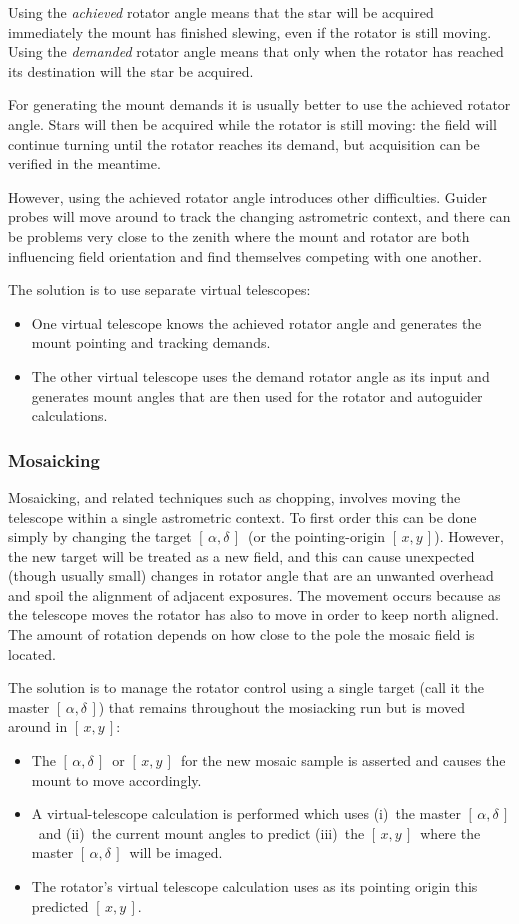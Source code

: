 \documentclass[12pt,fleqn,twoside]{article}
\renewcommand{\_}{{\tt\char'137}}     %
\newcommand{\radec}     {$[\,\alpha,\delta\,]$}
\newcommand{\xy}        {$[\,x,y\,]$}
\begin{document}
Using the {\it achieved}\/ rotator angle means that the star will be
acquired immediately the mount has finished slewing, even if the
rotator is still moving.  Using the {\it demanded}\/ rotator angle
means that only when the rotator has reached its destination will
the star be acquired.

For generating the mount demands it is usually better to use
the achieved rotator angle.  Stars will then be acquired while the
rotator is still moving:  the field will continue turning until the
rotator reaches its demand, but acquisition can be verified
in the meantime.

However, using the achieved rotator angle introduces other difficulties.
Guider probes will move around to track the changing astrometric
context,
and there can be problems very close to the zenith
where the mount and rotator are both influencing field orientation
and find themselves competing with one another.

The solution is to use separate virtual telescopes:
\begin{itemize}
\item One virtual telescope knows the achieved rotator angle and
      generates the mount pointing and tracking demands.
\item The other virtual telescope uses the demand rotator angle
      as its input and generates mount angles that are then used
      for the rotator and autoguider calculations.
\end{itemize}

\subsubsection{Mosaicking}
Mosaicking, and related techniques such as chopping, involves moving
the telescope within a single astrometric context.  To first order this
can be done simply by changing the target \radec\
(or the pointing-origin \xy).  However, the new target will be treated
as a new field, and this can cause unexpected (though usually small)
changes in rotator angle that are an unwanted overhead and spoil the
alignment of adjacent exposures.  The movement occurs because as the
telescope moves the rotator has also to move
in order to keep north aligned.  The amount of rotation depends
on how close to the pole the mosaic field is located.

The solution is to manage the rotator control using a single target
(call it the master \radec)
that remains throughout the mosiacking run but is moved around in \xy:
\begin{itemize}
\item The \radec\ or \xy\ for the new mosaic sample is asserted
      and causes the mount to move accordingly.
\item A virtual-telescope calculation is performed which uses (i)~the
      master \radec\ and (ii)~the current mount angles to
      predict (iii)~the \xy\ where the master \radec\ will be imaged.
\item The rotator's virtual telescope calculation uses as its
      pointing origin this predicted \xy.
\end{itemize}
\end{document}
